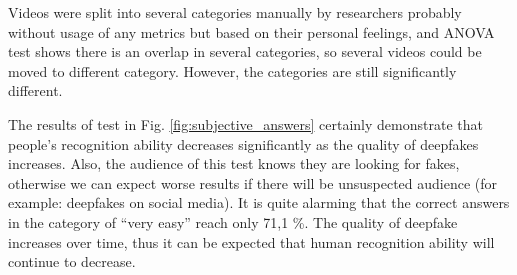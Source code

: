 Videos were split into several categories manually by researchers probably without usage of any metrics but based on their personal feelings, and ANOVA test shows there is an overlap in several categories, so several videos could be moved to different category. However, the categories are still significantly different. 

The results of test in Fig. \ref{fig:subjective_answers} certainly demonstrate that people's recognition ability decreases significantly as the quality of deepfakes increases. Also, the audience of this test knows they are looking for fakes, otherwise we can expect worse results if there will be unsuspected audience (for example: deepfakes on social media). It is quite alarming that the correct answers in the category of “very easy” reach only 71,1 \%. The quality of deepfake increases over time, thus it can be expected that human recognition ability will continue to decrease. \cite{TheThreatOfDeepfakes}

